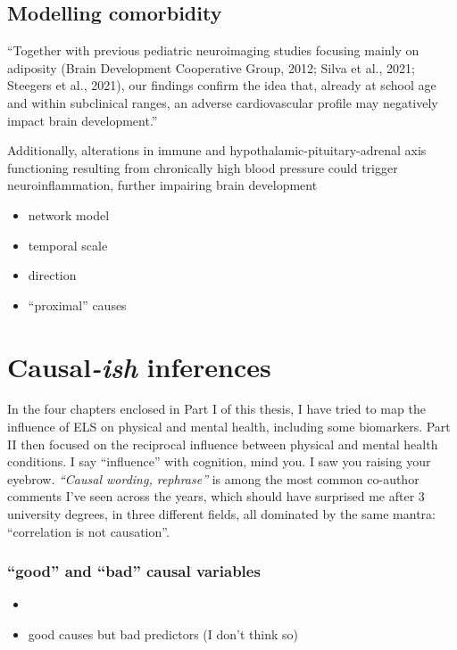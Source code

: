 \documentclass[
  letterpaper,
  DIV=11,
  numbers=noendperiod]{scrreport}
\providecommand{\tightlist}{%
  \setlength{\itemsep}{0pt}\setlength{\parskip}{0pt}}
\begin{document}
\subsection{Modelling comorbidity}\label{modelling-comorbidity}

``Together with previous pediatric neuroimaging studies focusing mainly
on adiposity (Brain Development Cooperative Group, 2012; Silva et al.,
2021; Steegers et al., 2021), our findings confirm the idea that,
already at school age and within subclinical ranges, an adverse
cardiovascular profile may negatively impact brain development.''

Additionally, alterations in immune and hypothalamic-pituitary-adrenal
axis functioning resulting from chronically high blood pressure could
trigger neuroinflammation, further impairing brain development

\begin{itemize}
\item
  network model
\item
  temporal scale
\item
  direction
\item
  ``proximal'' causes
\end{itemize}

\section{\texorpdfstring{Causal\emph{-ish}
inferences}{Causal-ish inferences}}\label{causal-ish-inferences}

In the four chapters enclosed in Part I of this thesis, I have tried to
map the influence of ELS on physical and mental health, including some
biomarkers. Part II then focused on the reciprocal influence between
physical and mental health conditions. I say ``influence'' with
cognition, mind you. I saw you raising your eyebrow. \emph{``Causal
wording, rephrase''} is among the most common co-author comments I've
seen across the years, which should have surprised me after 3 university
degrees, in three different fields, all dominated by the same mantra:
``correlation is not causation''.

\subsubsection{``good'' and ``bad'' causal
variables}\label{good-and-bad-causal-variables}

\begin{itemize}
\tightlist
\item
\item
  good causes but bad predictors (I don't think so)
\end{itemize}
\end{document}
